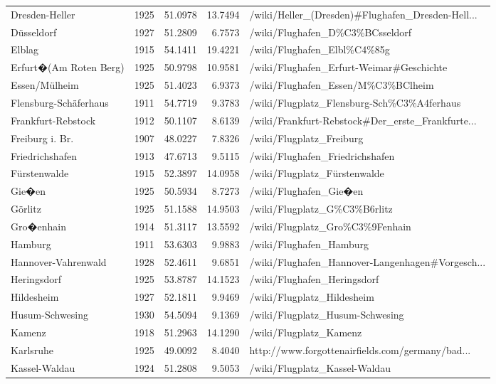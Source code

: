 \begin{table}[h!]
{\begin{tabular}{p{2.8cm}rrrp{6cm}}
  Dresden-Heller & 1925 & 51.0978 & 13.7494 & /wiki/Heller\_(Dresden)\#Flughafen\_Dresden-Hell... \\ 
  D\"usseldorf  & 1927 & 51.2809 & 6.7573 & /wiki/Flughafen\_D\%C3\%BCsseldorf \\ 
   \midrule
Elblag & 1915 & 54.1411 & 19.4221 & /wiki/Flughafen\_Elbl\%C4\%85g \\ 
  Erfurt�(Am Roten Berg) & 1925 & 50.9798 & 10.9581 & /wiki/Flughafen\_Erfurt-Weimar\#Geschichte \\ 
  Essen/M\"ulheim & 1925 & 51.4023 & 6.9373 & /wiki/Flughafen\_Essen/M\%C3\%BClheim \\ 
  Flensburg-Sch\"aferhaus & 1911 & 54.7719 & 9.3783 & /wiki/Flugplatz\_Flensburg-Sch\%C3\%A4ferhaus \\ 
  Frankfurt-Rebstock & 1912 & 50.1107 & 8.6139 & /wiki/Frankfurt-Rebstock\#Der\_erste\_Frankfurte... \\ 
  Freiburg i. Br. & 1907 & 48.0227 & 7.8326 & /wiki/Flugplatz\_Freiburg \\ 
  Friedrichshafen & 1913 & 47.6713 & 9.5115 & /wiki/Flughafen\_Friedrichshafen \\ 
  F\"urstenwalde & 1915 & 52.3897 & 14.0958 & /wiki/Flugplatz\_F\"urstenwalde \\ 
  Gie�en & 1925 & 50.5934 & 8.7273 & /wiki/Flughafen\_Gie�en \\ 
  G\"orlitz & 1925 & 51.1588 & 14.9503 & /wiki/Flugplatz\_G\%C3\%B6rlitz \\ 
   \midrule
Gro�enhain & 1914 & 51.3117 & 13.5592 & /wiki/Flugplatz\_Gro\%C3\%9Fenhain \\ 
  Hamburg  & 1911 & 53.6303 & 9.9883 & /wiki/Flughafen\_Hamburg \\ 
  Hannover-Vahrenwald & 1928 & 52.4611 & 9.6851 & /wiki/Flughafen\_Hannover-Langenhagen\#Vorgesch... \\ 
  Heringsdorf & 1925 & 53.8787 & 14.1523 & /wiki/Flughafen\_Heringsdorf \\ 
  Hildesheim & 1927 & 52.1811 & 9.9469 & /wiki/Flugplatz\_Hildesheim \\ 
  Husum-Schwesing & 1930 & 54.5094 & 9.1369 & /wiki/Flugplatz\_Husum-Schwesing \\ 
  Kamenz & 1918 & 51.2963 & 14.1290 & /wiki/Flugplatz\_Kamenz \\ 
  Karlsruhe & 1925 & 49.0092 & 8.4040 & http://www.forgottenairfields.com/germany/bad... \\ 
  Kassel-Waldau & 1924 & 51.2808 & 9.5053 & /wiki/Flugplatz\_Kassel-Waldau \\ 

\end{tabular}}
\end{table}
